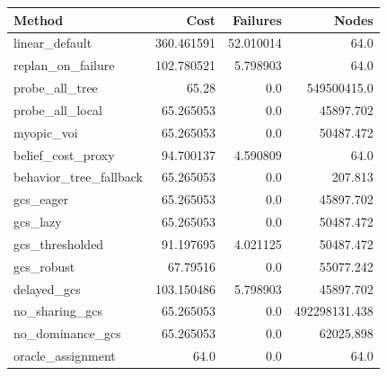 \begin{tabular}{lrrr}
\toprule
Method & Cost & Failures & Nodes \\
\midrule
linear\_default & 360.461591 & 52.010014 & 64.0 \\
replan\_on\_failure & 102.780521 & 5.798903 & 64.0 \\
probe\_all\_tree & 65.28 & 0.0 & 549500415.0 \\
probe\_all\_local & 65.265053 & 0.0 & 45897.702 \\
myopic\_voi & 65.265053 & 0.0 & 50487.472 \\
belief\_cost\_proxy & 94.700137 & 4.590809 & 64.0 \\
behavior\_tree\_fallback & 65.265053 & 0.0 & 207.813 \\
gcs\_eager & 65.265053 & 0.0 & 45897.702 \\
gcs\_lazy & 65.265053 & 0.0 & 50487.472 \\
gcs\_thresholded & 91.197695 & 4.021125 & 50487.472 \\
gcs\_robust & 67.79516 & 0.0 & 55077.242 \\
delayed\_gcs & 103.150486 & 5.798903 & 45897.702 \\
no\_sharing\_gcs & 65.265053 & 0.0 & 492298131.438 \\
no\_dominance\_gcs & 65.265053 & 0.0 & 62025.898 \\
oracle\_assignment & 64.0 & 0.0 & 64.0 \\
\bottomrule
\end{tabular}
